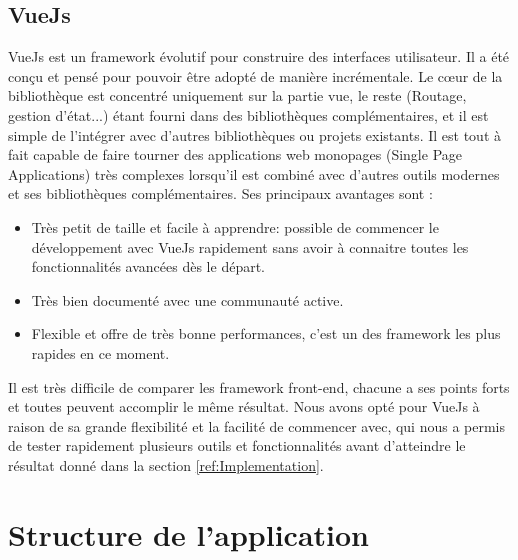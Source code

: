 \subsection{VueJs}
VueJs\cite{VueJs} est un framework évolutif pour construire des interfaces utilisateur. Il a été conçu et pensé pour pouvoir être adopté de manière incrémentale. Le cœur de la bibliothèque est concentré uniquement sur la partie vue, le reste (Routage, gestion d'état...) étant fourni dans des bibliothèques complémentaires, et il est simple de l'intégrer avec d'autres bibliothèques ou projets existants. 
Il est tout à fait capable de faire tourner des applications web monopages (Single Page Applications) très complexes lorsqu'il est combiné avec d'autres outils modernes et ses bibliothèques complémentaires.\newline
Ses principaux avantages sont : 
\begin{itemize}
	\item Très petit de taille et facile à apprendre: possible de commencer le développement avec VueJs rapidement sans avoir à connaitre toutes les fonctionnalités avancées dès le départ.
	\item Très bien documenté avec une communauté active.
	\item Flexible et offre de très bonne performances, c'est un des framework les plus rapides en ce moment.
\end{itemize}

Il est très difficile de comparer les framework front-end, chacune a ses points forts et toutes peuvent accomplir le même résultat. Nous avons opté pour VueJs à raison de sa grande flexibilité et la facilité de commencer avec, qui nous a permis de tester rapidement plusieurs outils et fonctionnalités avant d'atteindre le résultat donné dans la section \ref{ref:Implementation}.

\section{Structure de l'application}
